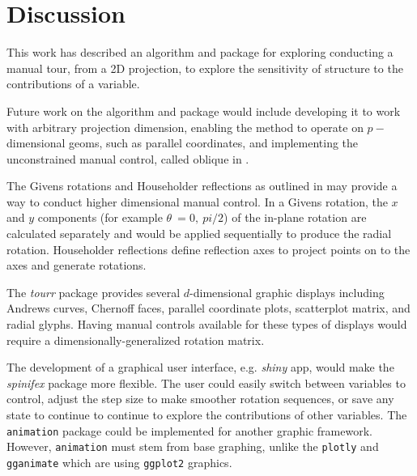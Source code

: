 \documentclass{monashthesis}
\begin{document}
\section{Discussion}\label{sec:discussion_paper}

This work has described an algorithm and package for exploring
conducting a manual tour, from a 2D projection, to explore the
sensitivity of structure to the contributions of a variable.

Future work on the algorithm and package would include developing it to
work with arbitrary projection dimension, enabling the method to operate
on \(p-\) dimensional geoms, such as parallel coordinates, and
implementing the unconstrained manual control, called oblique in
\textcite{cook_manual_1997}.

The Givens rotations and Householder reflections as outlined in
\textcite{buja_computational_2005} may provide a way to conduct higher
dimensional manual control. In a Givens rotation, the \(x\) and \(y\)
components (for example \(\theta~= 0,~pi/2\)) of the in-plane rotation
are calculated separately and would be applied sequentially to produce
the radial rotation. Householder reflections define reflection axes to
project points on to the axes and generate rotations.

The \emph{tourr} package provides several \(d\)-dimensional graphic
displays including Andrews curves, Chernoff faces, parallel coordinate
plots, scatterplot matrix, and radial glyphs. Having manual controls
available for these types of displays would require a
dimensionally-generalized rotation matrix.

The development of a graphical user interface, e.g. \emph{shiny} app,
would make the \emph{spinifex} package more flexible. The user could
easily switch between variables to control, adjust the step size to make
smoother rotation sequences, or save any state to continue to continue
to explore the contributions of other variables. The \texttt{animation}
package \textcite{xie_animation:_2018} could be implemented for another
graphic framework. However, \texttt{animation} must stem from base
graphing, unlike the \texttt{plotly} and \texttt{gganimate} which are
using \texttt{ggplot2} graphics.

\printbibliography[heading=bibintoc]
\end{document}
